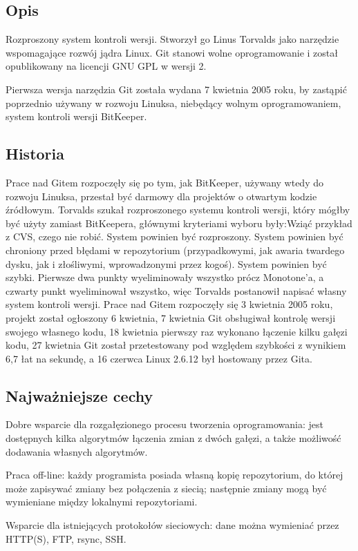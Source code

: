 \documentclass{article}
\begin{document}
\subsection{Opis}
Rozproszony system kontroli wersji. Stworzył go Linus Torvalds jako narzędzie wspomagające rozwój jądra Linux. Git stanowi wolne oprogramowanie i został opublikowany na licencji GNU GPL w wersji 2.

Pierwsza wersja narzędzia Git została wydana 7 kwietnia 2005 roku, by zastąpić poprzednio używany w rozwoju Linuksa, niebędący wolnym oprogramowaniem, system kontroli wersji BitKeeper.
\subsection{Historia}
Prace nad Gitem rozpoczęły się po tym, jak BitKeeper, używany wtedy do rozwoju Linuksa, przestał być darmowy dla projektów o otwartym kodzie źródłowym. Torvalds szukał rozproszonego systemu kontroli wersji, który mógłby być użyty zamiast BitKeepera, głównymi kryteriami wyboru były:Wziąć przykład z CVS, czego nie robić. System powinien być rozproszony.
System powinien być chroniony przed błędami w repozytorium (przypadkowymi, jak awaria twardego dysku, jak i złośliwymi, wprowadzonymi przez kogoś).
System powinien być szybki. Pierwsze dwa punkty wyeliminowały wszystko prócz Monotone'a, a czwarty punkt wyeliminował wszystko, więc Torvalds postanowił napisać własny system kontroli wersji.
Prace nad Gitem rozpoczęły się 3 kwietnia 2005 roku, projekt został ogłoszony 6 kwietnia, 7 kwietnia Git obsługiwał kontrolę wersji swojego własnego kodu, 18 kwietnia pierwszy raz wykonano łączenie kilku gałęzi kodu, 27 kwietnia Git został przetestowany pod względem szybkości z wynikiem 6,7 łat na sekundę, a 16 czerwca Linux 2.6.12 był hostowany przez Gita.
\subsection{Najważniejsze cechy}
Dobre wsparcie dla rozgałęzionego procesu tworzenia oprogramowania: jest dostępnych kilka algorytmów łączenia zmian z dwóch gałęzi, a także możliwość dodawania własnych algorytmów.

Praca off-line: każdy programista posiada własną kopię repozytorium, do której może zapisywać zmiany bez połączenia z siecią; następnie zmiany mogą być wymieniane między lokalnymi repozytoriami.

Wsparcie dla istniejących protokołów sieciowych: dane można wymieniać przez HTTP(S), FTP, rsync, SSH.
\end{document}
